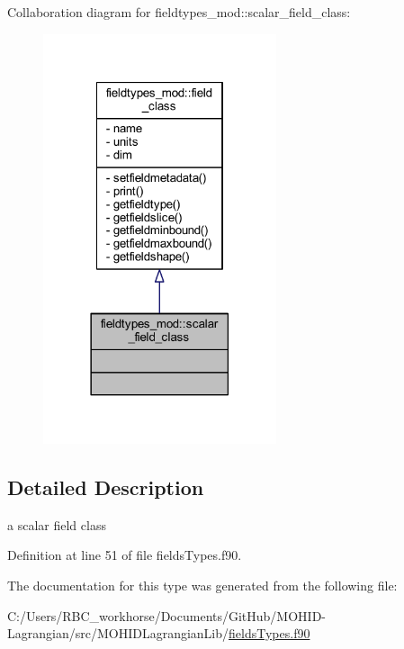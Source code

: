 Collaboration diagram for fieldtypes\+\_\+mod\+:\+:scalar\+\_\+field\+\_\+class\+:\nopagebreak
\begin{figure}[H]
\begin{center}
\leavevmode
\includegraphics[width=194pt]{structfieldtypes__mod_1_1scalar__field__class__coll__graph}
\end{center}
\end{figure}


\subsection{Detailed Description}
a scalar field class 

Definition at line 51 of file fields\+Types.\+f90.



The documentation for this type was generated from the following file\+:\begin{DoxyCompactItemize}
\item 
C\+:/\+Users/\+R\+B\+C\+\_\+workhorse/\+Documents/\+Git\+Hub/\+M\+O\+H\+I\+D-\/\+Lagrangian/src/\+M\+O\+H\+I\+D\+Lagrangian\+Lib/\mbox{\hyperlink{fields_types_8f90}{fields\+Types.\+f90}}\end{DoxyCompactItemize}
